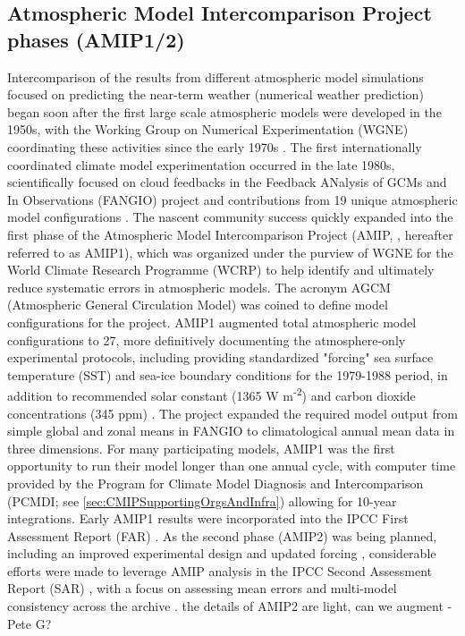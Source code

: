 \documentclass[gmd, preprint]{copernicus}
\def\cred#1{{\color{red}#1}}
\begin{document}
\subsection{Atmospheric Model Intercomparison Project phases (AMIP1/2)}
\label{sec:amip1And2}
Intercomparison of the results from different atmospheric model simulations focused on predicting the near-term weather (numerical weather prediction) began soon after the first large scale atmospheric models were developed in the 1950s, with the Working Group on Numerical Experimentation (WGNE) coordinating these activities since the early 1970s \citep{gates_ams_1992}. The first internationally coordinated climate model experimentation occurred in the late 1980s, scientifically focused on cloud feedbacks in the Feedback ANalysis of GCMs and In Observations (FANGIO) project and contributions from 19 unique atmospheric model configurations \citep{cess_methodology_1988, cess_interpretation_1989, cess_intercomparison_1990, cess_first_1991}. The nascent community success quickly expanded into the first phase of the Atmospheric Model Intercomparison Project (AMIP, \citet{gates_amip_1992}, hereafter referred to as AMIP1), which was organized under the purview of WGNE for the World Climate Research Programme (WCRP) to help identify and ultimately reduce systematic errors in atmospheric models. The acronym AGCM (Atmospheric General Circulation Model) was coined to define model configurations for the project. AMIP1 augmented total atmospheric model configurations to 27, more definitively documenting the atmosphere-only experimental protocols, including providing standardized "forcing" sea surface temperature (SST) and sea-ice boundary conditions for the 1979-1988 period, in addition to recommended solar constant (1365 W m\textsuperscript{-2}) and carbon dioxide concentrations (345 ppm) \citep{gates_amip_1991}. The project expanded the required model output from simple global and zonal means in FANGIO to climatological annual mean data in three dimensions. For many participating models, AMIP1 was the first opportunity to run their model longer than one annual cycle, with computer time provided by the Program for Climate Model Diagnosis and Intercomparison (PCMDI; see \autoref{sec:CMIPSupportingOrgsAndInfra}) allowing for 10-year integrations. Early AMIP1 results were incorporated into the IPCC First Assessment Report (FAR) \citep{gates_validation_1990}. As the second phase (AMIP2) was being planned, including an improved experimental design and updated forcing \citep{liang_pcmdi_1997, taylor_pcmdi_2000}, considerable efforts were made to leverage AMIP analysis in the IPCC Second Assessment Report (SAR) \citep{gates_climate_1996}, with a focus on assessing mean errors and multi-model consistency across the archive \citep{gates_amip_1995}. \cred{the details of AMIP2 are light, can we augment - Pete G?}
\end{document}
